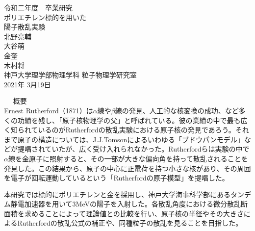 \documentclass[a4paper,11pt]{jsarticle}
\begin{document}
\begin{center}
{\Large 令和二年度　卒業研究}\\
{\HUGE ポリエチレン標的を用いた\\陽子散乱実験}\\
\vspace*{8cm}
{\LARGE 北野亮輔}\\
{\LARGE 大谷萌}\\
{\LARGE 金奎}\\
{\LARGE 木村将}\\
\vspace*{0.5cm}
{\LARGE 神戸大学理学部物理学科 粒子物理学研究室}\\
\vspace*{2cm}
{\LARGE 2021年 3月19日}
\end{center}
\thispagestyle{empty}

\newpage
\thispagestyle{empty}
　
\newpage
{\LARGE 概要}\\

Ernest Rutherford（1871）は$\alpha$線や$\beta$線の発見、人工的な核変換の成功、など多くの功績を残し、「原子核物理学の父」と呼ばれている。彼の業績の中で最も広く知られているのがRutherfordの散乱実験における原子核の発見であろう。それまで原子の構造については、J.J.Tomsonによるいわゆる「ブドウパンモデル」などが提唱されていたが、広く受け入れられなかった。Rutherfordらは実験の中で$\alpha$線を金原子に照射すると、その一部が大きな偏向角を持って散乱されることを発見した。この結果から、原子の中心に正電荷を持つ小さな核があり、その周囲を電子が回転運動しているという「Rutherfordの原子模型」を提唱した。

本研究では標的にポリエチレンと金を採用し、神戸大学海事科学部にあるタンデム静電加速器を用いて3MeVの陽子を入射した。各散乱角度における微分散乱断面積を求めることによって理論値との比較を行い、原子核の半径やその大きさによるRutherfordの散乱公式の補正や、同種粒子の散乱を見ることを目指した。


\thispagestyle{empty}

\newpage
\thispagestyle{empty}
\setcounter{tocdepth}{3}
\tableofcontents
\thispagestyle{empty}
\thispagestyle{empty}
\end{document}
